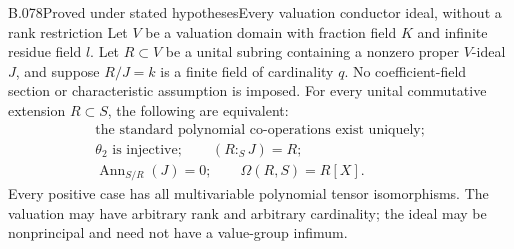 \begin{saresult}{B.078}{Proved under stated hypotheses}{Every valuation conductor ideal, without a rank restriction}
Let $V$ be a valuation domain with fraction field $K$ and infinite
residue field $l$. Let $R\subset V$ be a unital subring containing a
nonzero proper $V$-ideal $J$, and suppose $R/J=k$ is a finite field
of cardinality $q$. No coefficient-field section or characteristic
assumption is imposed. For every unital
commutative extension $R\subset S$, the following are equivalent:
\[
\begin{gathered}
 \text{the standard polynomial co-operations exist uniquely};\\
 \theta_2\text{ is injective};\qquad (R:_S J)=R;\\
 \operatorname{Ann}_{S/R}(J)=0;\qquad \Omega(R,S)=R[X].
                                                        \tag{B78.1}
\end{gathered}
\]
Every positive case has all multivariable polynomial tensor isomorphisms.
The valuation may have arbitrary rank and arbitrary cardinality; the ideal
may be nonprincipal and need not have a value-group infimum.
\end{saresult}
